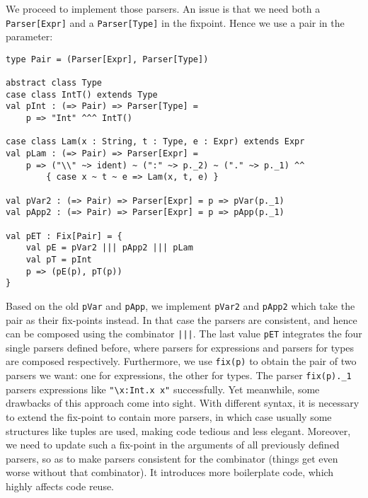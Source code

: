We proceed to implement those parsers. An issue is that we need both a \lstinline{Parser[Expr]} and a \lstinline{Parser[Type]} in the fixpoint.
Hence we use a pair in the parameter:
\begin{lstlisting}
type Pair = (Parser[Expr], Parser[Type])

abstract class Type
case class IntT() extends Type
val pInt : (=> Pair) => Parser[Type] =
    p => "Int" ^^^ IntT()

case class Lam(x : String, t : Type, e : Expr) extends Expr
val pLam : (=> Pair) => Parser[Expr] =
    p => ("\\" ~> ident) ~ (":" ~> p._2) ~ ("." ~> p._1) ^^
        { case x ~ t ~ e => Lam(x, t, e) }

val pVar2 : (=> Pair) => Parser[Expr] = p => pVar(p._1)
val pApp2 : (=> Pair) => Parser[Expr] = p => pApp(p._1)

val pET : Fix[Pair] = {
    val pE = pVar2 ||| pApp2 ||| pLam
    val pT = pInt
    p => (pE(p), pT(p))
}
\end{lstlisting}
Based on the old \lstinline{pVar} and \lstinline{pApp}, we implement \lstinline{pVar2} and \lstinline{pApp2} which take the pair as their fix-points instead.
In that case the parsers are consistent, and hence can be composed using the combinator \lstinline{|||}.
The last value \lstinline{pET} integrates the four single parsers defined before, where parsers for expressions and parsers for types are composed respectively. Furthermore, we use \lstinline{fix(p)} to obtain the pair of two parsers we want: one for expressions, the other for types. The parser \lstinline{fix(p)._1} parsers expressions like \lstinline{"\x:Int.x x"} successfully. Yet meanwhile, some drawbacks of this approach come into sight. With different syntax, it
is necessary to extend the fix-point to contain more parsers, in which case usually some structures like tuples are used,
making code tedious and less elegant. Moreover, we need to update such a fix-point in the arguments of all previously defined parsers, so as to make parsers consistent for the combinator (things get even worse without that combinator). It introduces more boilerplate code, which highly affects code reuse.

